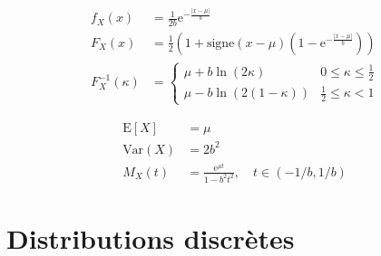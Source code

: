 \documentclass[12pt, titlepage,french]{article}
\begin{document}
\begin{distributions}
\begin{definitionNOHFILLsub}[Fonctions]
\begin{align*}
	f_{X}(x)
	&=	\frac{1}{2b}	\textrm{e}^{-\frac{|x	-	\mu|}{b}}	\\
	F_{X}(x)
	&=	\frac{1}{2}\left( 1 + \textrm{signe}(x	-	\mu)\left(1	-	\textrm{e}^{-\frac{|x	-	\mu|}{b}}\right)\right)	\\
	F_{X}^{-1}(\kappa)
	&=	\begin{cases}
		\mu	+	b\ln(2\kappa)	&	0	\leq	\kappa	\leq	\frac{1}{2}	\\
		\mu	-	b\ln\left(2(1	-	\kappa)\right)	&	\frac{1}{2}	\leq	\kappa	<	1
		\end{cases}
\end{align*}
\end{definitionNOHFILLsub}

\begin{definitionNOHFILLsub}[Moments]
\begin{align*}
	\textrm{E}[X]
	&=	\mu 	\\
	\textrm{Var}(X)
	&=	2b^{2}	\\
	M_{X}(t)
	&=	\frac{\textrm{e}^{\mu t}}{1	-	b^{2}t^{2}}, 	\quad	t	\in (-1/b, 1/b)
\end{align*}
\end{definitionNOHFILLsub}

\end{distributions}


\clearpage
\section{Distributions discrètes}
\end{document}
